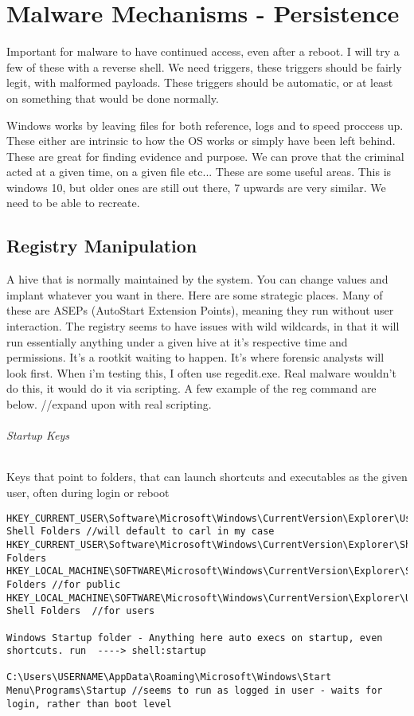

\chapter{Malware Mechanisms - Persistence}
Important for malware to have continued access, even after a reboot. I will try a few of these with a reverse shell. 
We need triggers, these triggers should be fairly legit, with malformed payloads. These triggers should be automatic, or at least on something that would be done normally.

Windows works by leaving files for both reference, logs and to speed proccess up. These either are intrinsic to how the OS works or simply have been left behind. 
These are great for finding evidence and purpose. We can prove that the criminal acted at a given time, on a given file etc... These are some useful areas. This is windows 10, but older ones are still out there, 7 upwards are very similar. We need to be able to recreate.

\section{Registry Manipulation}
A hive that is normally maintained by the system. You can change values and implant whatever you want in there. Here are some strategic places. 
Many of these are ASEPs (AutoStart Extension Points), meaning they run without user interaction. The registry seems to have issues with wild wildcards, 
in that it will run essentially anything under a given hive at it's respective time and permissions. It's a rootkit waiting to happen. 
It's where forensic analysts will look first. When i'm testing this, I often use regedit.exe. Real malware wouldn't do this, it would do it via scripting. 
A few example of the reg command are below. 
//expand upon with real scripting.


\subparagraph{Startup Keys}
Keys that point to folders, that can launch shortcuts and executables as the given user, often during login or reboot
\begin{lstlisting}[label=RegistryStartupKeys,caption=Registry Startup Key Locations]
HKEY_CURRENT_USER\Software\Microsoft\Windows\CurrentVersion\Explorer\User Shell Folders //will default to carl in my case
HKEY_CURRENT_USER\Software\Microsoft\Windows\CurrentVersion\Explorer\Shell Folders
HKEY_LOCAL_MACHINE\SOFTWARE\Microsoft\Windows\CurrentVersion\Explorer\Shell Folders //for public
HKEY_LOCAL_MACHINE\SOFTWARE\Microsoft\Windows\CurrentVersion\Explorer\User Shell Folders  //for users

Windows Startup folder - Anything here auto execs on startup, even shortcuts. run  ----> shell:startup

C:\Users\USERNAME\AppData\Roaming\Microsoft\Windows\Start Menu\Programs\Startup //seems to run as logged in user - waits for login, rather than boot level

\end{lstlisting}

